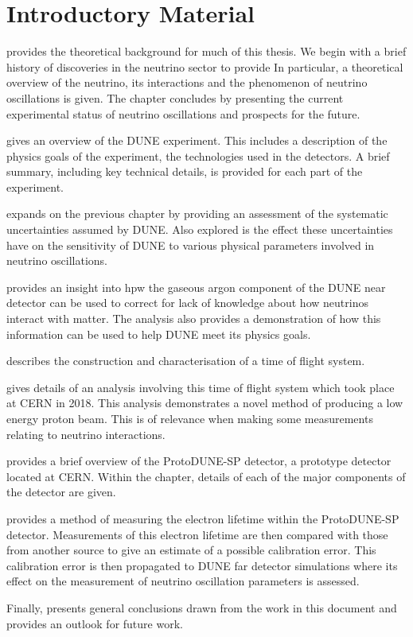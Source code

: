 \chapter{Introductory Material}
\label{sec:intro}

 provides the theoretical background for much of this thesis.
We begin with a brief history of discoveries in the neutrino sector to provide
In particular, a theoretical overview of the neutrino, its interactions and the phenomenon of neutrino oscillations is given.
The chapter concludes by presenting the current experimental status of neutrino oscillations and prospects for the future.

 gives an overview of the DUNE experiment. 
This includes a description of the physics goals of the experiment, the technologies used in the detectors. 
A brief summary, including key technical details, is provided for each part of the experiment.

 expands on the previous chapter by providing an assessment of the systematic uncertainties assumed by DUNE.
Also explored is the effect these uncertainties have on the sensitivity of DUNE to various physical parameters involved in neutrino oscillations.

 provides an insight into hpw the gaseous argon component of the DUNE near detector can be used to correct for lack of knowledge about how neutrinos interact with matter.
The analysis also provides a demonstration of how this information can be used to help DUNE meet its physics goals.

 describes the construction and characterisation of a time of flight system. 

 gives details of an analysis involving this time of flight system which took place at CERN in 2018.
This analysis demonstrates a novel method of producing a low energy proton beam.
This is of relevance when making some measurements relating to neutrino interactions.

 provides a brief overview of the ProtoDUNE-SP detector, a prototype detector located at CERN.
Within the chapter, details of each of the major components of the detector are given.

 provides a method of measuring the electron lifetime within the ProtoDUNE-SP detector.
Measurements of this electron lifetime are then compared with those from another source to give an estimate of a possible calibration error.
This calibration error is then propagated to DUNE far detector simulations where its effect on the measurement of neutrino oscillation parameters is assessed.

Finally,  presents general conclusions drawn from the work in this document and provides an outlook for future work.